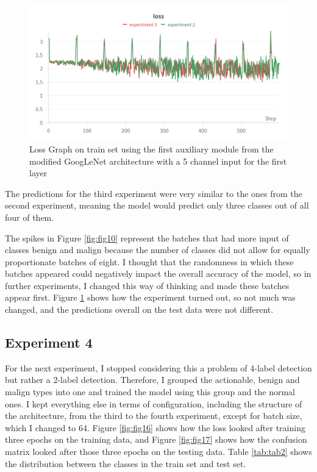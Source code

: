 \begin{figure}[!ht]
    \centering
    \includegraphics[width=1\textwidth]{figures/Figure14.png}
    \caption{Loss Graph on train set using the first auxiliary module from the modified GoogLeNet architecture with a 5 channel input for the first layer}
    \label{fig:fig13}
\end{figure}

The predictions for the third experiment were very similar to the ones from the second experiment, meaning the model would predict only three classes out of all four of them.

The spikes in Figure \ref{fig:fig10} represent the batches that had more input of classes benign and malign because the number of classes did not allow for equally proportionate batches of eight. I thought that the randomness in which these batches appeared could negatively impact the overall accuracy of the model, so in further experiments, I changed this way of thinking and made these batches appear first. Figure \ref{fig:fig13} shows how the experiment turned out, so not much was changed, and the predictions overall on the test data were not different.

\subsection{Experiment 4}

For the next experiment, I stopped considering this a problem of 4-label detection but rather a 2-label detection. Therefore, I grouped the actionable, benign and malign types into one and trained the model using this group and the normal ones. I kept everything else in terms of configuration, including the structure of the architecture, from the third to the fourth experiment, except for batch size, which I changed to 64. Figure \ref{fig:fig16} shows how the loss looked after training three epochs on the training data, and Figure \ref{fig:fig17} shows how the confusion matrix looked after those three epochs on the testing data. Table \ref{tab:tab2} shows the distribution between the classes in the train set and test set.

